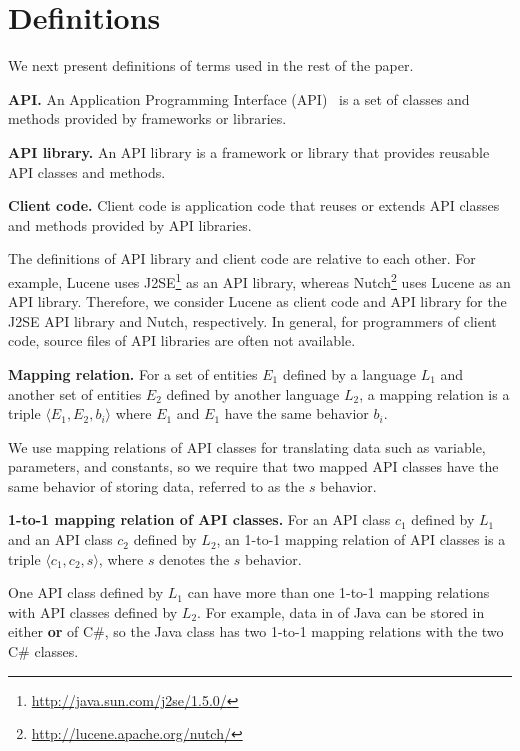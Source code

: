 \section{Definitions}
\label{sec:mapping}

We next present definitions of terms used in the rest of the paper.

\textbf{API.} An Application Programming Interface (API)~\cite{orenstein2000quickstudy}
is a set of classes and methods provided by frameworks or libraries.

\textbf{API library.} An API library is a framework
or library that provides reusable API classes and methods.

\textbf{Client code.} Client code is application code
that reuses or extends API classes and methods provided by API
libraries.

The definitions of API library and client code are
relative to each other. For example, Lucene uses
J2SE\footnote{\url{http://java.sun.com/j2se/1.5.0/}} as an API
library, whereas Nutch\footnote{\url{http://lucene.apache.org/nutch/}} uses Lucene as
an API library. Therefore, we consider Lucene as client code and API
library for the J2SE API library and Nutch, respectively. In
general, for programmers of client code, source files of API libraries are often
not available.

\textbf{Mapping relation.} For a set of entities $E_1$ defined by a
language $L_1$ and another set of entities $E_2$ defined by another
language $L_2$, a mapping relation is a triple $\langle E_1, E_2,
b_i \rangle$ where $E_1$ and $E_1$ have the same behavior $b_i$.


We use mapping relations of API classes for translating data such as
variable, parameters, and constants, so we require that two mapped
API classes have the same behavior of storing data, referred to as
the $s$ behavior.

\textbf{1-to-1 mapping relation of API classes.} For an API class
$c_1$ defined by $L_1$ and an API class $c_2$ defined by $L_2$, an
1-to-1 mapping relation of API classes is a triple $\langle c_1,
c_2, s \rangle$, where $s$ denotes the $s$ behavior.

One API class defined by $L_1$ can have more than one 1-to-1 mapping
relations with API classes defined by $L_2$. For example, data in
 of Java can be stored in either
 \textbf{or}
 of C\#, so the Java class
has two 1-to-1 mapping relations with the two C\# classes.

